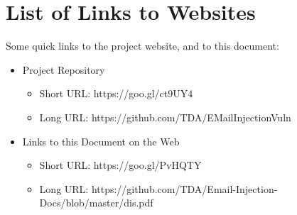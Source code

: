 \section{List of Links to Websites}
\pagebreak
Some quick links to the project website, and to this document:
\begin{itemize}
	\item Project Repository
	\begin{itemize}
		\item Short URL: https://goo.gl/ct9UY4
		\item Long URL: https://github.com/TDA/EMailInjectionVuln
	\end{itemize}
	\item Links to this Document on the Web
	\begin{itemize}
		\item Short URL: https://goo.gl/PvHQTY
		\item Long URL: https://github.com/TDA/Email-Injection-Docs/blob/master/dis.pdf
	\end{itemize}
\end{itemize}
